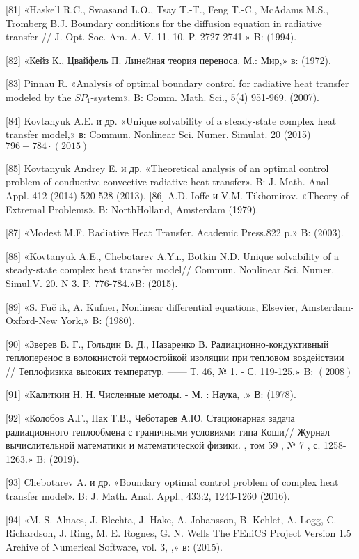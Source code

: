 \documentclass[10pt]{article}
\begin{document}
[81] «Haskell R.C., Svaasand L.O., Tsay T.-T., Feng T.-C., McAdams M.S., Tromberg B.J. Boundary conditions for the diffusion equation in radiative transfer // J. Opt. Soc. Am. A. V. 11. 10. P. 2727-2741.» B: (1994).

[82] «Кейз К., Цвайфель П. Линейная теория переноса. М.: Мир,» в: (1972).

[83] Pinnau R. «Analysis of optimal boundary control for radiative heat transfer modeled by the $S P_{1}$-system». B: Comm. Math. Sci., 5(4) 951-969. (2007).

[84] Kovtanyuk A.E. и др. «Unique solvability of a steady-state complex heat transfer model,» в: Commun. Nonlinear Sci. Numer. Simulat. 20 (2015) $796-784 \cdot(2015)$

[85] Kovtanyuk Andrey E. и др. «Theoretical analysis of an optimal control problem of conductive convective radiative heat transfer». B: J. Math. Anal. Appl. 412 (2014) 520-528 (2013). [86] A.D. Ioffe и V.M. Tikhomirov. «Theory of Extremal Problems». B: NorthHolland, Amsterdam (1979).

[87] «Modest M.F. Radiative Heat Transfer. Academic Press.822 p.» B: (2003).

[88] «Kovtanyuk A.E., Chebotarev A.Yu., Botkin N.D. Unique solvability of a steady-state complex heat transfer model// Commun. Nonlinear Sci. Numer. Simul.V. 20. N 3. P. 776-784.»B: (2015).

[89] «S. Fuč ik, A. Kufner, Nonlinear differential equations, Elsevier, Amsterdam-Oxford-New York,» B: (1980).

[90] «Зверев В. Г., Гольдин В. Д., Назаренко В. Радиационно-кондуктивный теплоперенос в волокнистой термостойкой изоляции при тепловом воздействии // Теплофизика высоких температур. —— Т. 46, № 1. - С. 119-125.» B: $(2008)$

[91] «Калиткин Н. Н. Численные методы. - М. : Наука, .» В: (1978).

[92] «Колобов А.Г., Пак Т.В., Чеботарев А.Ю. Стационарная задача радиационного теплообмена с граничными условиями типа Коши// Журнал вычислительной математики и математической физики. , том 59 , № 7 , с. 1258-1263.» B: (2019).

[93] Chebotarev A. и др. «Boundary optimal control problem of complex heat transfer model». B: J. Math. Anal. Appl., 433:2, 1243-1260 (2016).

[94] «M. S. Alnaes, J. Blechta, J. Hake, A. Johansson, B. Kehlet, A. Logg, C. Richardson, J. Ring, M. E. Rognes, G. N. Wells The FEniCS Project Version 1.5 Archive of Numerical Software, vol. 3, ,» в: (2015).
\end{document}
